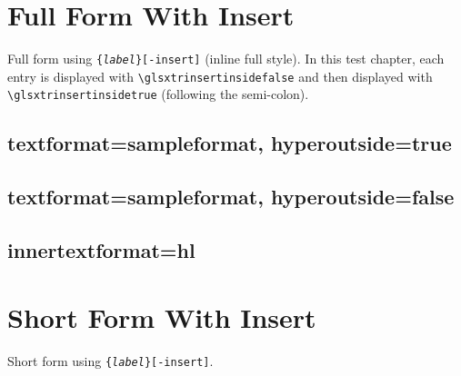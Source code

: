 \documentclass{report}
\newcommand{\marg}[1]{\{\textnormal{\emph{#1}}\}}
\begin{document}

\chapter{Full Form With Insert}
Full form using \texttt{\string\glsxtrfull\marg{label}[-insert]} (inline full style).
In this test chapter, each entry is displayed
with \verb|\glsxtrinsertinsidefalse| and then displayed with
\verb|\glsxtrinsertinsidetrue| 
(following the semi-colon).


\section{textformat=sampleformat, hyperoutside=true}


\section{textformat=sampleformat, hyperoutside=false}


\section{innertextformat=hl}


\chapter{Short Form With Insert}
Short form using \texttt{\string\glsxtrshort\marg{label}[-insert]}.
\end{document}
